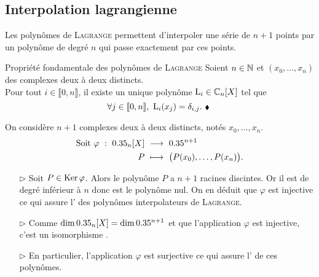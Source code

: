 \subsection{Interpolation lagrangienne}

Les polynômes de \textsc{Lagrange} permettent d'interpoler une série de $n+1$ points par un polynôme de degré $n$ qui passe exactement par ces points.

\begin{theo}{Propriété fondamentale des polynômes de \textsc{Lagrange}}
    Soient $n \in \mathbb{N}$ et $(x_0, \dots, x_n)$ des complexes deux à deux distincts. \\
    Pour tout $i \in \llbracket 0, n \rrbracket$, il existe un unique polynôme $\mathrm{L}_i \in \mathbb{C}_n[X]$ tel que 
    \begin{equation} \label{prop_fondamentale}
        \forall j \in \llbracket 0, n \rrbracket,\ \mathrm{L}_i(x_j) = \delta_{i,j}.\ \hbox{\scriptsize $\blacklozenge$\ }
    \end{equation}
\end{theo}


\begin{preuve}
    On considère $n + 1$ complexes deux à deux distincts, notés $x_0, \dots, x_n$.
    \begin{alignat*}{2}
        \text{Soit } \varphi\ :\ \R_n[X]\ &\longrightarrow\ \R^{n+1}\\
        P\ &\longmapsto\ \big(P(x_0), \dots, P(x_n) \big).
    \end{alignat*}
    \begin{itemize}
        \item[$\rhd$] Soit $P \in \mathrm{Ker}\, \varphi$. Alors le polynôme $P$ a $n+1$ racines discintes. Or il est de degré inférieur à $n$ donc est le polynôme nul. On en déduit que $\varphi$ est injective ce qui assure l' des polynômes interpolateurs de \textsc{Lagrange}.
        \item[$\rhd$] Comme $\dim 0.35_n[X] = \dim 0.35^{n+1}$ et que l'application $\varphi$ est injective, c'est un isomorphisme \note.
        \item[$\rhd$] En particulier, l'application $\varphi$ est surjective ce qui assure l' de ces polynômes. 
    \end{itemize}
\end{preuve}

